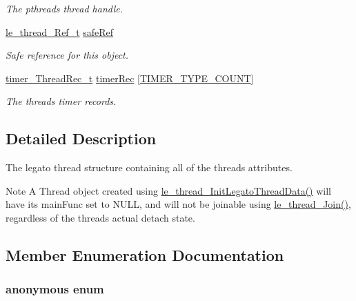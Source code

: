 \begin{DoxyCompactItemize}
\begin{DoxyCompactList}\small\item\em The pthreads thread handle. \end{DoxyCompactList}\item 
\hyperlink{le__thread_8h_a32121104c6b4ca39008eb79a4d6862f2}{le\+\_\+thread\+\_\+\+Ref\+\_\+t} \hyperlink{structthread___obj__t_ac268584582c908726d0d746350972b2f}{safe\+Ref}
\begin{DoxyCompactList}\small\item\em Safe reference for this object. \end{DoxyCompactList}\item 
\hyperlink{structtimer___thread_rec__t}{timer\+\_\+\+Thread\+Rec\+\_\+t} \hyperlink{structthread___obj__t_a634ddcc7916e806a6a91bdc49b6c2b12}{timer\+Rec} \mbox{[}\hyperlink{timer_8h_a16e283905d31ea12799612f365c72072a79f99f690b374c85dbe125cc7e28f87a}{T\+I\+M\+E\+R\+\_\+\+T\+Y\+P\+E\+\_\+\+C\+O\+U\+NT}\mbox{]}
\begin{DoxyCompactList}\small\item\em The thread\textquotesingle{}s timer records. \end{DoxyCompactList}\end{DoxyCompactItemize}


\subsection{Detailed Description}
The legato thread structure containing all of the thread\textquotesingle{}s attributes.

\begin{DoxyNote}{Note}
A Thread object created using \hyperlink{le__thread_8h_a3e35d530ce76e97a627dc60100fc1475}{le\+\_\+thread\+\_\+\+Init\+Legato\+Thread\+Data()} will have its main\+Func set to N\+U\+LL, and will not be joinable using \hyperlink{le__thread_8h_adf7f24fec4859ca12a52b16ce43fd9b8}{le\+\_\+thread\+\_\+\+Join()}, regardless of the thread\textquotesingle{}s actual detach state. 
\end{DoxyNote}


\subsection{Member Enumeration Documentation}
\subsubsection[{\texorpdfstring{anonymous enum}{anonymous enum}}]{\setlength{\rightskip}{0pt plus 5cm}anonymous enum}\hypertarget{structthread___obj__t_a25079c9733844395e70d1434b0f9f474}{}\label{structthread___obj__t_a25079c9733844395e70d1434b0f9f474}


